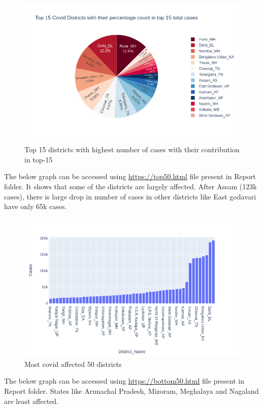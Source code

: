 \documentclass[12pt]{article}
\begin{document}
\begin{figure}[h!]
\centering
\includegraphics[scale=.5]{top15}
\caption{Top 15 districts with highest number of cases with their contribution in top-15}
\end{figure}
The below graph can be accessed using \href{https://top50.html}{https://top50.html} file present in Report folder. It shows that some of the districts are largely affected. After Assam (123k cases), there is large drop in number of cases in other districts like East godavari have only 65k cases.
\begin{figure}[h!]
\centering
\includegraphics[scale=.4]{top50}
\caption{Most covid affected 50 districts}
\end{figure}
\newpage
The below graph can be accessed using \href{https://bottom50.html}{https://bottom50.html} file present in Report folder. States like Arunachal Pradesh, Mizoram, Meghalaya and Nagaland are least affected.
\end{document}
